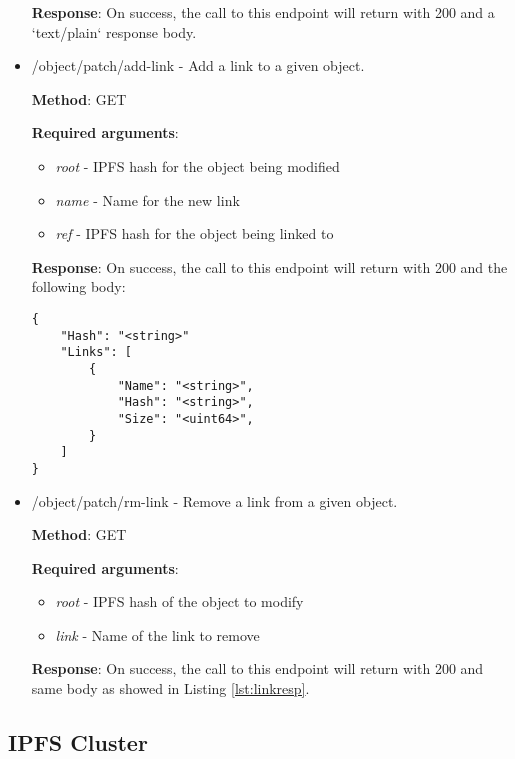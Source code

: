 \documentclass[12pt]{report}
\begin{document}
\begin{itemize}
\textbf{Response}: On success, the call to this endpoint will return with 200 and a `text/plain` response body.

\item {\ttfamily /object/patch/add-link} - Add a link to a given object.

\textbf{Method}: GET

\textbf{Required arguments}: 
\begin{itemize}
\item \textit{root} - IPFS hash for the object being modified
\item \textit{name}	- Name for the new link
\item \textit{ref} - IPFS hash for the object being linked to
\end{itemize}

\textbf{Response}: On success, the call to this endpoint will return with 200 and the following body:

\newpage

\begin{lstlisting}
{
    "Hash": "<string>"
    "Links": [
        {
            "Name": "<string>",
            "Hash": "<string>",
            "Size": "<uint64>",
        }
    ]
}
\end{lstlisting}


\item {\ttfamily /object/patch/rm-link} - Remove a link from a given object.

\textbf{Method}: GET

\textbf{Required arguments}:
\begin{itemize}
\item \textit{root} - IPFS hash of the object to modify
\item \textit{link} - Name of the link to remove
\end{itemize}

\textbf{Response}: On success, the call to this endpoint will return with 200 and same body as showed in Listing \ref{lst:linkresp}.


\end{itemize}

\subsection{IPFS Cluster}
\end{document}

